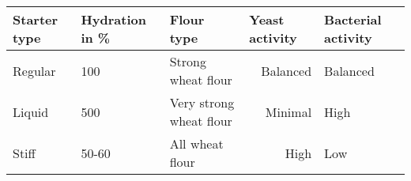 


\begin{tabular}{lllrl}
\toprule
\textbf{Starter type} & \textbf{Hydration in \%} & \textbf{Flour type}     & \multicolumn{1}{l}{\textbf{Yeast activity}} & \textbf{Bacterial activity} \\ \midrule
Regular               & 100                      & Strong wheat flour      & Balanced                                     & Balanced                    \\ \midrule
Liquid                & 500                      & Very strong wheat flour & Minimal                                      & High                        \\ \midrule
Stiff                 & 50-60                    & All wheat flour         &
High                                         & Low                         \\
\bottomrule
\end{tabular}

